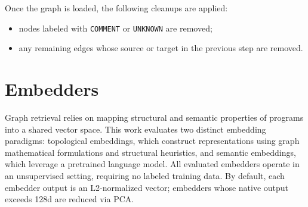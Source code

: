  
Once the graph is loaded, the following cleanups are applied:
\begin{itemize}
  \item nodes labeled with \verb|COMMENT| or \verb|UNKNOWN| are removed;
  \item any remaining edges whose source or target in the previous step are removed.
\end{itemize}

\section{Embedders}

Graph retrieval relies on mapping structural and semantic properties of programs into a shared vector space.
This work evaluates two distinct embedding paradigms: topological embeddings, which construct representations using graph mathematical formulations and structural heuristics, and semantic embeddings, which leverage a pretrained language model.
All evaluated embedders operate in an unsupervised setting, requiring no labeled training data.
By default, each embedder output is an L2-normalized vector; embedders whose native output exceeds 128d are reduced via PCA.


